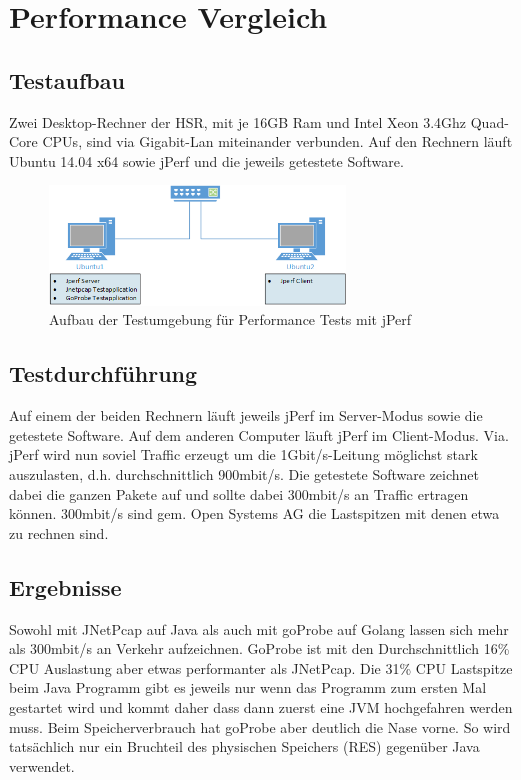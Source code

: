 \section{Performance Vergleich}
\label{sec:Performance Vergleich}

\subsection{Testaufbau}
Zwei Desktop-Rechner der HSR, mit je 16GB Ram und Intel Xeon 3.4Ghz Quad-Core CPUs, sind via Gigabit-Lan miteinander verbunden. Auf den Rechnern läuft Ubuntu 14.04 x64 sowie jPerf und die jeweils getestete Software.

\begin{figure}[ht]
    \begin{center}
		\includegraphics[width=0.7\textwidth]{start/img/PerformanceEvaluation.png}
    \end{center}
    \caption{Aufbau der Testumgebung für Performance Tests mit jPerf}
\end{figure}

\subsection{Testdurchführung}
Auf einem der beiden Rechnern läuft jeweils jPerf im Server-Modus sowie die getestete Software. Auf dem anderen Computer läuft jPerf im Client-Modus.
Via. jPerf wird nun soviel Traffic erzeugt um die 1Gbit/s-Leitung möglichst stark auszulasten, d.h. durchschnittlich 900mbit/s. Die getestete Software zeichnet dabei die ganzen Pakete auf und sollte dabei 300mbit/s an Traffic ertragen können. 300mbit/s sind gem. Open Systems AG die Lastspitzen mit denen etwa zu rechnen sind.

\subsection{Ergebnisse}
Sowohl mit JNetPcap auf Java als auch mit goProbe auf Golang lassen sich mehr als 300mbit/s an Verkehr aufzeichnen. GoProbe ist mit den Durchschnittlich 16\% CPU Auslastung aber etwas performanter als JNetPcap. Die 31\% CPU Lastspitze beim Java Programm gibt es jeweils nur wenn das Programm zum ersten Mal gestartet wird und kommt daher dass dann zuerst eine \acs{JVM} hochgefahren werden muss.
Beim Speicherverbrauch hat goProbe aber deutlich die Nase vorne. So wird tatsächlich nur ein Bruchteil des physischen Speichers (RES\footnotemark[2]) gegenüber Java verwendet.

